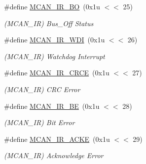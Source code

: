 \begin{DoxyCompactItemize}
\mbox{\label{group__SAME70__MCAN_ga4282a266cc0f193b378f6750e0e8fa4a}} 
\#define \mbox{\hyperlink{group__SAME70__MCAN_ga4282a266cc0f193b378f6750e0e8fa4a}{M\+C\+A\+N\+\_\+\+I\+R\+\_\+\+BO}}~(0x1u $<$$<$ 25)
\begin{DoxyCompactList}\small\item\em (M\+C\+A\+N\+\_\+\+IR) Bus\+\_\+\+Off Status \end{DoxyCompactList}\item 
\mbox{\label{group__SAME70__MCAN_gacddac7de39f6a6950ae3c88a7cf10ed4}} 
\#define \mbox{\hyperlink{group__SAME70__MCAN_gacddac7de39f6a6950ae3c88a7cf10ed4}{M\+C\+A\+N\+\_\+\+I\+R\+\_\+\+W\+DI}}~(0x1u $<$$<$ 26)
\begin{DoxyCompactList}\small\item\em (M\+C\+A\+N\+\_\+\+IR) Watchdog Interrupt \end{DoxyCompactList}\item 
\mbox{\label{group__SAME70__MCAN_gaf094030b971b110bdbc9ad3a412caa08}} 
\#define \mbox{\hyperlink{group__SAME70__MCAN_gaf094030b971b110bdbc9ad3a412caa08}{M\+C\+A\+N\+\_\+\+I\+R\+\_\+\+C\+R\+CE}}~(0x1u $<$$<$ 27)
\begin{DoxyCompactList}\small\item\em (M\+C\+A\+N\+\_\+\+IR) C\+RC Error \end{DoxyCompactList}\item 
\mbox{\label{group__SAME70__MCAN_ga9430656b360511ed86f8d3bd80a64e75}} 
\#define \mbox{\hyperlink{group__SAME70__MCAN_ga9430656b360511ed86f8d3bd80a64e75}{M\+C\+A\+N\+\_\+\+I\+R\+\_\+\+BE}}~(0x1u $<$$<$ 28)
\begin{DoxyCompactList}\small\item\em (M\+C\+A\+N\+\_\+\+IR) Bit Error \end{DoxyCompactList}\item 
\mbox{\label{group__SAME70__MCAN_ga64633020fb048c6f0078ac8a5934739d}} 
\#define \mbox{\hyperlink{group__SAME70__MCAN_ga64633020fb048c6f0078ac8a5934739d}{M\+C\+A\+N\+\_\+\+I\+R\+\_\+\+A\+C\+KE}}~(0x1u $<$$<$ 29)
\begin{DoxyCompactList}\small\item\em (M\+C\+A\+N\+\_\+\+IR) Acknowledge Error \end{DoxyCompactList}\item 
$$
\end{DoxyCompactItemize}
